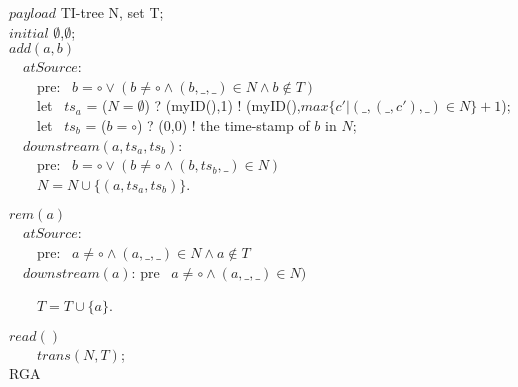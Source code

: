\renewcommand{\algorithmcfname}{CRDT}
\noindent
\noindent\begin{algorithm}[H]
$\mathit{payload}$ TI-tree N, set T; \\
$\mathit{initial}$ $\emptyset$,$\emptyset$; \\ 

$add(a,b)$ \\
\ \ $\mathit{atSource}$: \\
\ \ \ \ pre: \ $b = \circ \vee ( b \neq \circ \wedge (b,\_,\_) \in N \wedge b \notin T)$ \\    



\ \ \ \ let \ $ts_a$ = ($N = \emptyset$) ? (myID(),1) ! (myID(),$\mathit{max}\{ c' \vert (\_,(\_,c'),\_) \in N \} +1$); \\ 
\ \ \ \ let \ $ts_b$ = ($b = \circ$) ? (0,0) ! the time-stamp of $b$ in $N$; \\ 

\ \ $\mathit{downstream}(a,ts_a,ts_b)$: \\
\ \ \ \ pre: \ $b = \circ \vee ( b \neq \circ \wedge (b,ts_b,\_) \in N)$ \\ 

\ \ \ \ $N = N \cup \{ (a,ts_a,ts_b) \}$. 


$rem(a)$ \\
\ \ $\mathit{atSource}$: \\ 
\ \ \ \ pre: \ $a \neq \circ \wedge (a,\_,\_) \in N \wedge a \notin T$ \\

\ \ $\mathit{downstream}(a)$: pre \ $a \neq \circ \wedge (a,\_,\_) \in N)$

\ \ \ \ $T = T \cup \{ a \}$. 

$read()$ \\ 
\ \ \ \ \KwRet $\mathit{trans}(N,T)$; \\ 

\caption{RGA}
\label{Method1}
\end{algorithm}


